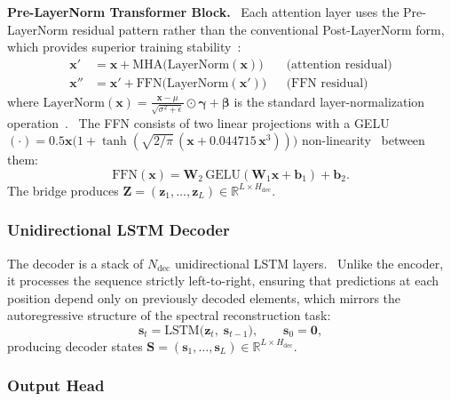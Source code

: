 \documentclass[12pt,a4paper]{report}
\begin{document}
\textbf{Pre-LayerNorm Transformer Block.}  Each attention layer uses the Pre-LayerNorm residual pattern rather than the conventional Post-LayerNorm form, which provides superior training stability~\cite{preln}:
\begin{align}
\mathbf{x}' &= \mathbf{x} + \text{MHA}\!\big(\text{LayerNorm}(\mathbf{x})\big) && \text{(attention residual)} \label{eq:prenorm_attn} \\
\mathbf{x}'' &= \mathbf{x}' + \text{FFN}\!\big(\text{LayerNorm}(\mathbf{x}')\big) && \text{(FFN residual)} \label{eq:prenorm_ffn}
\end{align}
where $\text{LayerNorm}(\mathbf{x}) = \frac{\mathbf{x} - \mu}{\sqrt{\sigma^2 + \epsilon}} \odot \boldsymbol{\gamma} + \boldsymbol{\beta}$ is the standard layer-normalization operation~\cite{layernorm}.  The FFN consists of two linear projections with a GELU$(\cdot) = 0.5\mathbf{x}\big(1 + \tanh(\sqrt{2/\pi}\,(\mathbf{x} + 0.044715\,\mathbf{x}^3))\big)$ non-linearity~\cite{gelu} between them:
\begin{equation}
\text{FFN}(\mathbf{x}) = \mathbf{W}_2\,\text{GELU}(\mathbf{W}_1\mathbf{x} + \mathbf{b}_1) + \mathbf{b}_2.
\label{eq:ffn}
\end{equation}
The bridge produces $\mathbf{Z} = (\mathbf{z}_1, \dots, \mathbf{z}_L) \in \mathbb{R}^{L \times H_{\mathrm{dec}}}$.

\bigskip
\subsubsection{Unidirectional LSTM Decoder}

The decoder is a stack of $N_{\mathrm{dec}}$ unidirectional LSTM layers.  Unlike the encoder, it processes the sequence strictly left-to-right, ensuring that predictions at each position depend only on previously decoded elements, which mirrors the autoregressive structure of the spectral reconstruction task:
\begin{equation}
\mathbf{s}_t = \text{LSTM}\!\big(\mathbf{z}_t,\; \mathbf{s}_{t-1}\big), \qquad \mathbf{s}_0 = \mathbf{0},
\label{eq:decoder_lstm}
\end{equation}
producing decoder states $\mathbf{S} = (\mathbf{s}_1, \dots, \mathbf{s}_L) \in \mathbb{R}^{L \times H_{\mathrm{dec}}}$.

\bigskip
\subsubsection{Output Head}
\end{document}
